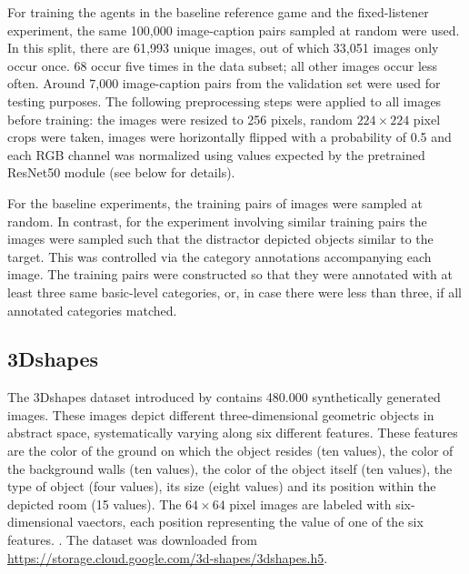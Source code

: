 For training the agents in the baseline reference game and the fixed-listener experiment, the same 100,000 image-caption pairs sampled at random were used. In this split, there are 61,993 unique images, out of which 33,051 images only occur once. 68 occur five times in the data subset; all other images occur less often. Around 7,000 image-caption pairs from the validation set were used for testing purposes. 
The following preprocessing steps were applied to all images before training: the images were resized to 256 pixels, random $224\times224$ pixel crops were taken, images were horizontally flipped with a probability of 0.5 and each RGB channel was normalized using values expected by the pretrained ResNet50 module (see below for details).

For the baseline experiments, the training pairs of images were sampled at random. In contrast, for the experiment involving similar training pairs the images were sampled such that the distractor depicted objects similar to the target. This was controlled via the category annotations accompanying each image. The training pairs were constructed so that they were annotated with at least three same basic-level categories, or, in case there were less than three, if all annotated categories matched.

\subsection{3Dshapes}
The 3Dshapes dataset introduced by \textcite{burgess20183d} contains 480.000 synthetically generated images. These images depict different three-dimensional geometric objects in abstract space, systematically varying along six different features. These features are the color of the ground on which the object resides (ten values), the color of the background walls (ten values), the color of the object itself (ten values), the type of object (four values), its size (eight values) and its position within the depicted room (15 values). %
The $64\times64$ pixel images are labeled with six-dimensional vaectors, each position representing the value of one of the six features. 
.
The dataset was downloaded from \url{https://storage.cloud.google.com/3d-shapes/3dshapes.h5}.

